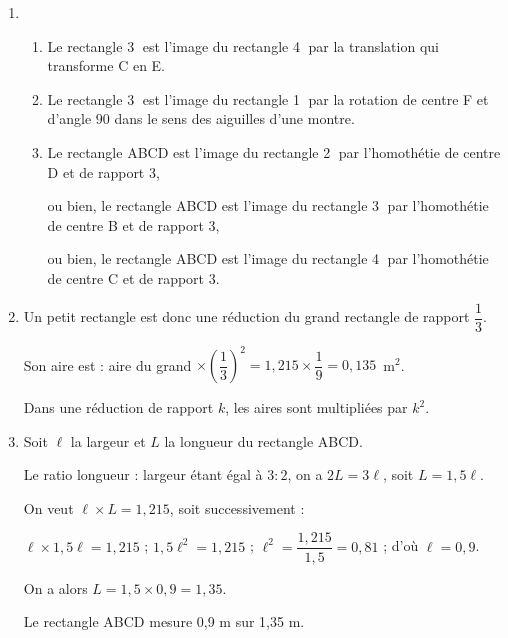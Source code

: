 
\medskip

\begin{enumerate}
\item 
	\begin{enumerate}
		\item Le rectangle \textcircled{3} est l'image du rectangle \textcircled{4} par la translation qui transforme C en E. 
		\item Le rectangle \textcircled{3} est l'image du rectangle \textcircled{1} par la rotation de centre F et d'angle $90$\degres{} dans le sens des aiguilles d'une montre. 
		\item Le rectangle ABCD est l'image du rectangle \textcircled{2} par l'homothétie de centre D et de rapport 3,
		
ou bien, le rectangle ABCD est l'image du rectangle \textcircled{3} par l'homothétie de centre B et de rapport 3,

ou bien,  le rectangle ABCD est l'image du rectangle \textcircled{4} par l'homothétie de centre C et de rapport 3.	
	\end{enumerate}
\item Un petit rectangle est donc une réduction du grand rectangle de rapport $\dfrac{1}{3}$. 

Son aire est : aire du grand $\times \left(\dfrac{1}{3}\right)^2 = 1,215  \times \dfrac{1}{9}  = 0,135$~m$^2$.

Dans une réduction de rapport $k$, les aires sont multipliées par $k^2$.
\item Soit $\ell$ la largeur et $L$ la longueur du rectangle ABCD. 

Le ratio longueur : largeur étant égal à $3 : 2$, on a $2L = 3\ell$, soit $L = 1,5\ell$.

On veut $\ell \times L = 1,215$, soit successivement :

$\ell \times 1,5  \ell = 1,215$ ; $1,5\ell^2 = 1,215$ ;
$\ell^2 = \dfrac{1,215}{1,5} = 0,81$ ; d'où $\ell = 0,9$.

On a alors $L = 1,5 \times  0,9 = 1,35$.

Le rectangle ABCD mesure 0,9 m sur 1,35 m.
\end{enumerate}

\bigskip

